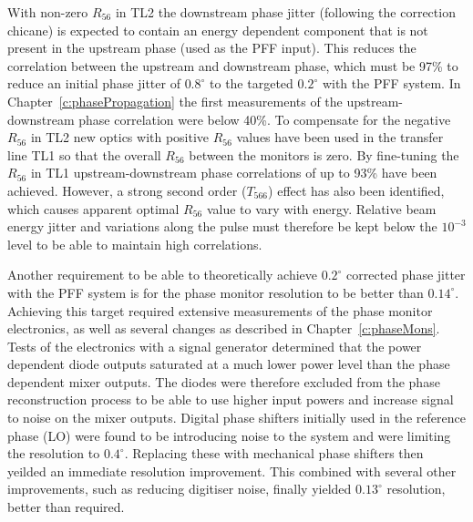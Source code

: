 With non-zero \(R_{56}\) in TL2 the downstream phase jitter (following the correction chicane) is expected to contain an energy dependent component that is not present in the upstream phase (used as the PFF input). This reduces the correlation between the upstream and downstream phase, which must be 97\% to reduce an initial phase jitter of \(0.8^\circ\) to the targeted \(0.2^\circ\) with the PFF system. In Chapter~\ref{c:phasePropagation} the first measurements of the upstream-downstream phase correlation were below 40\%. To compensate for the negative \(R_{56}\) in TL2 new optics with positive \(R_{56}\) values have been used in the transfer line TL1 so that the overall \(R_{56}\) between the monitors is zero. By fine-tuning the \(R_{56}\) in TL1 upstream-downstream phase correlations of up to 93\% have been achieved. However, a strong second order (\(T_{566}\)) effect has also been identified, which causes apparent optimal \(R_{56}\) value to vary with energy. Relative beam energy jitter and variations along the pulse must therefore be kept below the \(10^{-3}\) level to be able to maintain high correlations. 

Another requirement to be able to theoretically achieve \(0.2^\circ\) corrected phase jitter with the PFF system is for the phase monitor resolution to be better than \(0.14^\circ\). Achieving this target required extensive measurements of the phase monitor electronics, as well as several changes as described in Chapter~\ref{c:phaseMons}. Tests of the electronics with a signal generator determined that the power dependent diode outputs saturated at a much lower power level than the phase dependent mixer outputs. The diodes were therefore excluded from the phase reconstruction process to be able to use higher input powers and increase signal to noise on the mixer outputs. Digital phase shifters initially used in the reference phase (LO) were found to be introducing noise to the system and were limiting the resolution to \(0.4^\circ\). Replacing these with mechanical phase shifters then yeilded an immediate resolution improvement. This combined with several other improvements, such as reducing digitiser noise, finally yielded \(0.13^\circ\) resolution, better than required.

